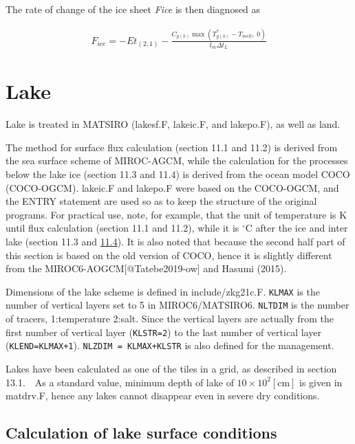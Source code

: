 The rate of change of the ice sheet \emph{Fice} is then diagnosed as

\begin{eqnarray}
 F_{ice} = - Et_{(2,1)} - \frac{C_{g(k)}\max(T_{g(k)}^\ast - T_{melt},\ 0)}{l_m \Delta t_L}
\end{eqnarray}

\hypertarget{lake}{%
\section{Lake}\label{lake}}

Lake is treated in MATSIRO (lakesf.F, lakeic.F, and lakepo.F), as well as land.

The method for surface flux calculation (section 11.1 and 11.2) is derived from the sea surface scheme of MIROC-AGCM, while the calculation for the processes below the lake ice (section 11.3 and 11.4)
is derived from the ocean model COCO (COCO-OGCM). lakeic.F and lakepo.F were based on the COCO-OGCM, and the ENTRY statement are used so as to keep the structure of the original programs. For
practical use, note, for example, that the unit of temperature is \(\mathrm{K}\) until flux calculation (section 11.1 and 11.2), while it is \(\mathrm{^{\circ}C}\) after the ice and inter lake
(section 11.3 and \href{}{11.4}). It is also noted that because the second half part of this section is based on the old version of COCO, hence it is slightly different from the
MIROC6-AOGCM{[}@Tatebe2019-ow{]} and Hasumi (2015).

Dimensions of the lake scheme is defined in include/zkg21c.F. \texttt{KLMAX} is the number of vertical layers set to 5 in MIROC6/MATSIRO6. \texttt{NLTDIM} is the number of tracers, 1:temperature
2:salt. Since the vertical layers are actually from the first number of vertical layer (\texttt{KLSTR=2}) to the last number of vertical layer (\texttt{KLEND=KLMAX+1}). \texttt{NLZDIM\ =\ KLMAX+KLSTR}
is also defined for the management.

Lakes have been calculated as one of the tiles in a grid, as described in section 13.1.　As a standard value, minimum depth of lake of \(10 \times 10^2 \mathrm{[cm]}\) is given in matdrv.F, hence any
lakes cannot disappear even in severe dry conditions.

\hypertarget{calculation-of-lake-surface-conditions}{%
\subsection{Calculation of lake surface conditions}\label{calculation-of-lake-surface-conditions}}

